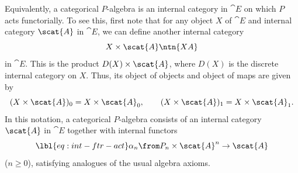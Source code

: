 Equivalently, a categorical $P$-algebra is an internal category in
$\cat{E}$ on which $P$ acts functorially.  To see this, first note that for
any object $X$ of $\cat{E}$ and internal category $\scat{A}$ in $\cat{E}$,
we can define another internal category
\[
X \times \scat{A}
\ntn{XA}
\]
in $\cat{E}$.  This is the product $D(X) \times \scat{A}$, where $D(X)$ is
the discrete internal category on $X$.  Thus, its object of objects
and object of maps are given by
\[
(X \times \scat{A})_0 = X \times \scat{A}_0,
\qquad
(X \times \scat{A})_1 = X \times \scat{A}_1.
\]
In this notation, a categorical $P$-algebra consists of an internal
category $\scat{A}$ in $\cat{E}$ together with internal functors
% 
\begin{equation}
\lbl{eq:int-ftr-act}
\alpha_n \from P_n \times \scat{A}^n \to \scat{A}
\end{equation}
% 
($n \geq 0$), satisfying analogues of the usual algebra axioms.  


